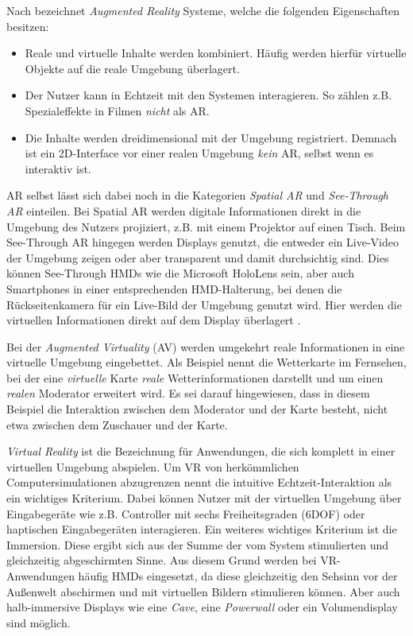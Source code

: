Nach \textcite{Azuma1997} bezeichnet \emph{Augmented Reality} Systeme, welche die folgenden Eigenschaften besitzen:
\begin{itemize}
    \item Reale und virtuelle Inhalte werden kombiniert. Häufig werden hierfür virtuelle Objekte auf die reale Umgebung überlagert.
    \item Der Nutzer kann in Echtzeit mit den Systemen interagieren. So zählen z.B. Spezialeffekte in Filmen \emph{nicht} als AR.
    \item Die Inhalte werden dreidimensional mit der Umgebung registriert. Demnach ist ein 2D-Interface vor einer realen Umgebung \emph{kein} AR, selbst wenn es interaktiv ist.
\end{itemize}
AR selbst lässt sich dabei noch in die Kategorien \emph{Spatial AR} und \emph{See-Through AR} einteilen.
Bei Spatial AR werden digitale Informationen direkt in die Umgebung des Nutzers projiziert, z.B. mit einem Projektor auf einen Tisch.
Beim See-Through AR hingegen werden Displays genutzt, die entweder ein Live-Video der Umgebung zeigen oder aber transparent und damit durchsichtig sind.
Dies können See-Through HMDs wie die Microsoft HoloLens sein, aber auch Smartphones in einer entsprechenden HMD-Halterung, bei denen die Rückseitenkamera für ein Live-Bild der Umgebung genutzt wird.
Hier werden die virtuellen Informationen direkt auf dem Display überlagert \autocite{Zachmann2015}.

Bei der \emph{Augmented Virtuality} (AV) werden umgekehrt reale Informationen in eine virtuelle Umgebung eingebettet.
Als Beispiel nennt \textcite[6]{Schroeder2017} die Wetterkarte im Fernsehen, bei der eine \emph{virtuelle} Karte \emph{reale} Wetterinformationen darstellt und um einen \emph{realen} Moderator erweitert wird.
Es sei darauf hingewiesen, dass in diesem Beispiel die Interaktion zwischen dem Moderator und der Karte besteht, nicht etwa zwischen dem Zuschauer und der Karte.

\emph{Virtual Reality} ist die Bezeichnung für Anwendungen, die sich komplett in einer virtuellen Umgebung abspielen.
Um VR von herkömmlichen Computersimulationen abzugrenzen nennt \textcite{Zachmann2015} die intuitive Echtzeit-Interaktion als ein wichtiges Kriterium.
Dabei können Nutzer mit der virtuellen Umgebung über Eingabegeräte wie z.B. Controller mit sechs Freiheitsgraden (6DOF) oder haptischen Eingabegeräten interagieren.
Ein weiteres wichtiges Kriterium ist die Immersion.
Diese ergibt sich aus der Summe der vom System stimulierten und gleichzeitig abgeschirmten Sinne.
Aus diesem Grund werden bei VR-Anwendungen häufig HMDs eingesetzt, da diese gleichzeitig den Sehsinn vor der Außenwelt abschirmen und mit virtuellen Bildern stimulieren können.
Aber auch halb-immersive Displays wie eine \emph{Cave}, eine \emph{Powerwall} oder ein Volumendisplay sind möglich.

